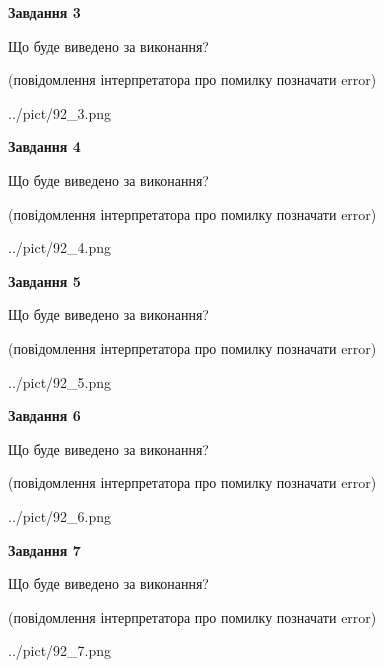 \documentclass[12pt, ukrainian]{article}
\begin{document}
{\begin {large}
{\begin {center}\textbf{Завдання 3}\end {center}}\par
Що буде виведено за виконання?\par
 (повідомлення інтерпретатора про помилку позначати error)\par
\begin{center}
	{../pict/92_3.png}
\end{center}
\newpage

{\begin {center}\textbf{Завдання 4}\end {center}}\par
Що буде виведено за виконання?\par
 (повідомлення інтерпретатора про помилку позначати error)\par
\begin{center}
	{../pict/92_4.png}
\end{center}
\newpage

{\begin {center}\textbf{Завдання 5}\end {center}}\par
Що буде виведено за виконання?\par
 (повідомлення інтерпретатора про помилку позначати error)\par
\begin{center}
	{../pict/92_5.png}
\end{center}
\newpage

{\begin {center}\textbf{Завдання 6}\end {center}}\par
Що буде виведено за виконання?\par
 (повідомлення інтерпретатора про помилку позначати error)\par
\begin{center}
	{../pict/92_6.png}
\end{center}
\newpage

{\begin {center}\textbf{Завдання 7}\end {center}}\par
Що буде виведено за виконання?\par
 (повідомлення інтерпретатора про помилку позначати error)\par
\begin{center}
	{../pict/92_7.png}
\end{center}
\newpage


\end{large}}
\end{document}
